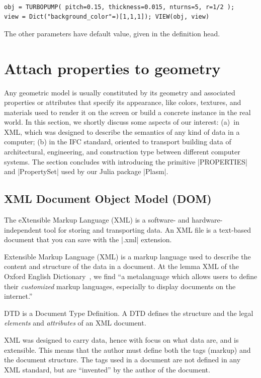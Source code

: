 \begin{coding}
\begin{coding}\ 
\begin{lstlisting}[language=JuliaLocal, style=julia, mathescape=true]
obj = TURBOPUMP( pitch=0.15, thickness=0.015, nturns=5, r=1/2 );
view = Dict("background_color"=)[1,1,1]); VIEW(obj, view)
\end{lstlisting}
The other parameters have default value, given in the definition head.
\end{coding}



\section{Attach properties to geometry}\label{sect:4-4}

Any geometric model is usually constituted by its geometry and associated properties or attributes that specify its appearance, like colors, textures, and materials used to render it on the screen or build a concrete instance in the real world. In this section, we shortly discuss some aspects of our interest: (a)~in XML, which was designed to describe the semantics of any kind of data in a computer; (b)  in the IFC standard, oriented to transport building data of architectural, engineering, and construction type between different computer systems. The section concludes with introducing the primitive |PROPERTIES| and |PropertySet| used by our Julia package |Plasm|.

\subsection*{XML Document Object Model (DOM)}\label{sect:4-4-1}

The eXtensible Markup Language (XML) is a software- and hardware-independent tool for storing and transporting data. An XML file is a text-based document that you can save with the |.xml| extension. 

Extensible Markup Language (XML) is a markup language used to describe the content and structure of the data in a document.
At the lemma XML of the Oxford English Dictionary~\cite{}, we find “a metalanguage which allows users to define their \emph{customized} markup languages, especially to display documents on the internet.”

\begin{definition} 
DTD is a Document Type Definition. A DTD defines the structure and the legal \emph{elements} and \emph{attributes} of an XML document.
\end{definition}
XML was designed to carry data, hence with focus on what data are, and is extensible. This means that the author must define both the tags (markup) and the document structure.
The tags used in a document are not defined in any XML standard, but are “invented” by the author of the document.


\end{coding}
